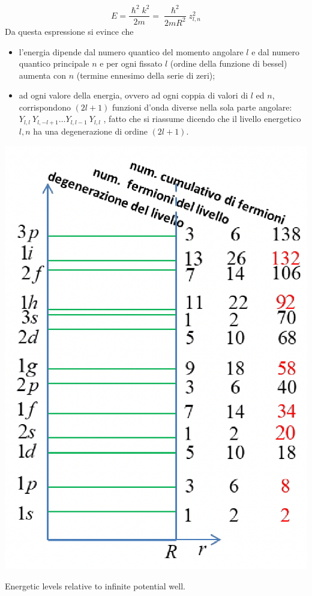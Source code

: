 \begin{equation}
	E = \frac{\hslash^{2}k^{2}}{2m} = \frac{\hslash^{2}}{2mR^{2}}z_{l,n}^{2}
	\label{eq:energy-levels-infinite-spherical-potential-well}
\end{equation}
Da questa espressione si evince che
\begin{itemize}
	\item l’energia dipende dal numero quantico del momento angolare $l$ e dal numero quantico principale  $n$ e per ogni fissato $l$ (ordine della funzione di bessel) aumenta con $n$ (termine ennesimo della serie di zeri);
	\item ad ogni valore della energia, ovvero ad ogni coppia di valori di $l$ ed $n$, corrispondono $(2l+1)$ funzioni d’onda
	diverse nella sola parte angolare: $Y_{l,l} \  Y_{l, -l+1} \dots Y_{l,l-1} \ Y_{l,l}$ , fatto che si riassume dicendo
	che il livello energetico $l, n$ ha una degenerazione di ordine $(2l+1)$.
\end{itemize}
\begin{marginfigure}
	\includegraphics{figs/energetic-levels-infinite-potential-well}
	\caption{Energetic levels relative to infinite potential well.}
	\label{fig:energetic-levels-infinite-potential-well}
\end{marginfigure}
